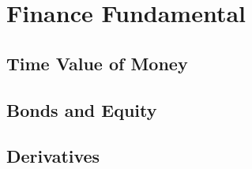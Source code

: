 \chapter{Finance Fundamental}
\section{Time Value of Money}
\section{Bonds and Equity}
\begin{exe}
\end{exe}
\begin{teacher}
\begin{sol}
\end{sol}
\end{teacher}

\begin{exe}
\end{exe}
\begin{teacher}
\begin{sol}
\end{sol}
\end{teacher}
\begin{exe}
\end{exe}
\begin{teacher}
\begin{sol}
\end{sol}
\end{teacher}
\begin{exe}
\end{exe}
\begin{teacher}
\begin{sol}
\end{sol}
\end{teacher}
\begin{exe}
\end{exe}
\begin{teacher}
\begin{sol}
\end{sol}
\end{teacher}
\begin{exe}
\end{exe}
\begin{teacher}
\begin{sol}
\end{sol}
\end{teacher}
\begin{exe}
\end{exe}
\begin{teacher}
\begin{sol}
\end{sol}
\end{teacher}

\section{Derivatives}
